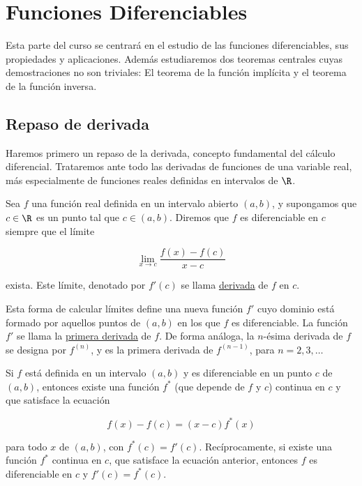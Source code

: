 \section{Funciones Diferenciables}

Esta parte del curso se centrará en el estudio de las funciones diferenciables, sus propiedades y aplicaciones. Además estudiaremos dos teoremas centrales cuyas demostraciones no son triviales: El teorema de la función implícita y el teorema de la función inversa.

\subsection{Repaso de derivada}

Haremos primero un repaso de la derivada, concepto fundamental del cálculo diferencial. Trataremos ante todo las derivadas de funciones de una variable real, más especialmente de funciones reales definidas en intervalos de $\R$.

\begin{defn}
    Sea $f$ una función real definida en un intervalo abierto $(a, b)$, y supongamos que $c \in \R$ es un punto tal que $c \in (a, b)$. Diremos que $f$ es diferenciable en $c$ siempre que el límite
    
    \[
    \lim_{x \to c} \frac{f(x) - f(c)}{x-c}
    \]
    
    \noindent exista. Este límite, denotado por $f'(c)$ se llama \ul{derivada} de $f$ en $c$.
\end{defn}

Esta forma de calcular límites define una nueva función $f'$ cuyo dominio está formado por aquellos puntos de $(a, b)$ en los que $f$ es diferenciable. La función $f'$ se llama la \ul{primera derivada} de $f$. De forma análoga, la $n$-ésima derivada de $f$ se designa por $f^{(n)}$, y es la primera derivada de $f^{(n-1)}$, para $n = 2, 3, \dots$

\begin{teo}\label{teo:teo1.1.1}
    Si $f$ está definida en un intervalo $(a, b)$ y es diferenciable en un punto $c$ de $(a, b)$, entonces existe una función $f^*$ (que depende de $f$ y $c$) continua en $c$ y que satisface la ecuación
    
    \begin{equation}\label{eq:eq1.1.1}
        f(x) - f(c) = (x-c)f^*(x)
    \end{equation}
    
    \noindent para todo $x$ de $(a, b)$, con $f^*(c) = f'(c)$. Recíprocamente, si existe una función $f^*$ continua en $c$, que satisface la ecuación anterior, entonces $f$ es diferenciable en $c$ y $f'(c) = f^*(c)$.
\end{teo}

